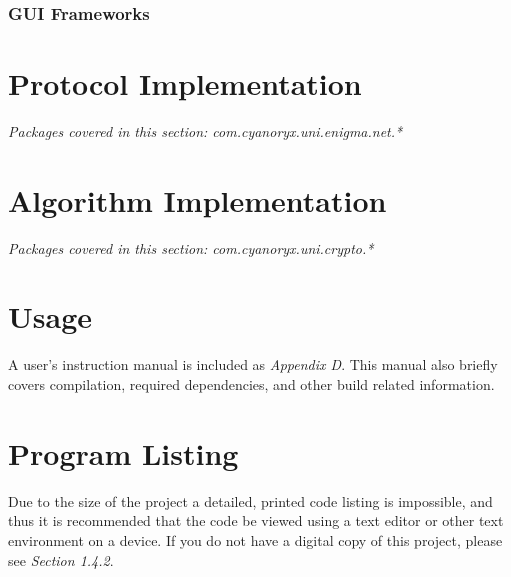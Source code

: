 \subsubsection{GUI Frameworks}

\section{Protocol Implementation}
\emph{Packages covered in this section: com.cyanoryx.uni.enigma.net.*}


\section{Algorithm Implementation}
\emph{Packages covered in this section: com.cyanoryx.uni.crypto.*}

\section{Usage}

A user's instruction manual is included as \emph{Appendix D}. This manual also briefly covers compilation, required dependencies, and other build related information.

\section{Program Listing}

Due to the size of the project a detailed, printed code listing is impossible, and thus it is recommended that the code be viewed using a text editor or other text environment on a device. If you do not have a digital copy of this project, please see \emph{Section 1.4.2}.